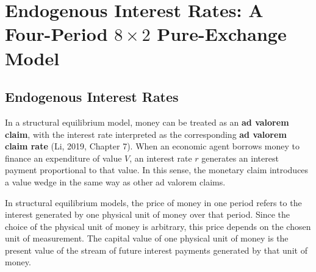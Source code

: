 \documentclass[
  letterpaper,
  DIV=11,
  numbers=noendperiod]{scrreprt}
\newenvironment{Shaded}{\begin{snugshade}}{\end{snugshade}}
\newcommand{\ConstantTok}[1]{\textcolor[rgb]{0.56,0.35,0.01}{#1}}
\newcommand{\FloatTok}[1]{\textcolor[rgb]{0.68,0.00,0.00}{#1}}
\newcommand{\FunctionTok}[1]{\textcolor[rgb]{0.28,0.35,0.67}{#1}}
\newcommand{\NormalTok}[1]{\textcolor[rgb]{0.00,0.23,0.31}{#1}}
\newcommand{\OperatorTok}[1]{\textcolor[rgb]{0.37,0.37,0.37}{#1}}
\newcommand{\PreprocessorTok}[1]{\textcolor[rgb]{0.68,0.00,0.00}{#1}}
\begin{document}
%

\section{\texorpdfstring{Endogenous Interest Rates: A Four-Period
\(8\times2\) Pure-Exchange
Model}{Endogenous Interest Rates: A Four-Period 8\textbackslash times2 Pure-Exchange Model}}\label{endogenous-interest-rates-a-four-period-8times2-pure-exchange-model}

\subsection{Endogenous Interest Rates}\label{endogenous-interest-rates}

In a structural equilibrium model, money can be treated as an \textbf{ad
valorem claim}, with the interest rate interpreted as the corresponding
\textbf{ad valorem claim rate} (Li, 2019, Chapter 7). When an economic
agent borrows money to finance an expenditure of value \(V\), an
interest rate \(r\) generates an interest payment proportional to that
value. In this sense, the monetary claim introduces a value wedge in the
same way as other ad valorem claims.

In structural equilibrium models, the price of money in one period
refers to the interest generated by one physical unit of money over that
period. Since the choice of the physical unit of money is arbitrary,
this price depends on the chosen unit of measurement. The capital value
of one physical unit of money is the present value of the stream of
future interest payments generated by that unit of money.
\end{document}
